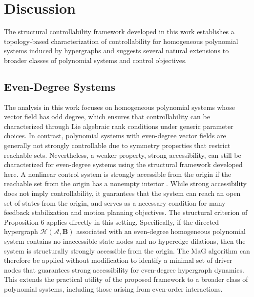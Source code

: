 \documentclass[journal,twoside,web]{ieeecolor}
\newcommand{\Bv}{\mathbf{B}}
\newcommand{\At}{\mathscr{A}}
\newcommand{\Hs}{\mathcal{H}}
\begin{document}
\section{Discussion}\label{sec:5.5}

The structural controllability framework developed in this work establishes a topology-based characterization of controllability for homogeneous polynomial systems induced by hypergraphs and suggests several natural extensions to broader classes of polynomial systems and control objectives.


\subsection{Even-Degree Systems}
The analysis in this work focuses on homogeneous polynomial systems whose vector field has odd degree, which ensures that controllability can be characterized through Lie algebraic rank conditions under generic parameter choices.
%
In contrast, polynomial systems with even-degree vector fields are generally not strongly controllable due to symmetry properties that restrict reachable sets.
%
Nevertheless, a weaker property, strong accessibility, can still be characterized for even-degree systems using the structural framework developed here.
%
A nonlinear control system is strongly accessible from the origin if the reachable set from the origin has a nonempty interior \cite{hermann1977nonlinear, jurdjevic1985polynomial}.
%
While strong accessibility does not imply controllability, it guarantees that the system can reach an open set of states from the origin, and serves as a necessary condition for many feedback stabilization and motion planning objectives.
The structural criterion of Proposition 6 applies directly in this setting.
%
Specifically, if the directed hypergraph $\Hs(\At, \Bv)$ associated with an even-degree homogeneous polynomial system contains no inaccessible state nodes and no hyperedge dilations, then the system is structurally strongly accessible from the origin.
%
The MaG algorithm can therefore be applied without modification to identify a minimal set of driver nodes that guarantees strong accessibility for even-degree hypergraph dynamics.
%
This extends the practical utility of the proposed framework to a broader class of polynomial systems, including those arising from even-order  interactions.
\end{document}
